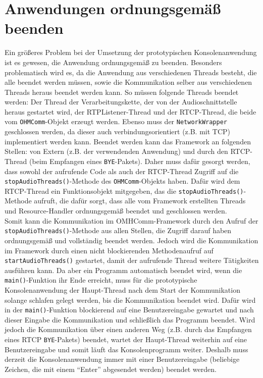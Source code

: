 \section{Anwendungen ordnungsgemäß beenden}
Ein größeres Problem bei der Umsetzung der prototypischen Konsolenanwendung ist es gewesen, die Anwendung ordnungsgemäß zu beenden. Besonders problematisch wird es, da die Anwendung aus verschiedenen Threads besteht, die alle beendet werden müssen, sowie die Kommunikation selber aus verschiedenen Threads heraus beendet werden kann. So müssen folgende Threads beendet werden: Der Thread der Verarbeitungskette, der von der Audioschnittstelle heraus gestartet wird, der RTPListener-Thread und der RTCP-Thread, die beide vom \texttt{OHMComm}-Objekt erzeugt werden. Ebenso muss der \texttt{NetworkWrapper} geschlossen werden, da dieser auch verbindungsorientiert (z.B. mit TCP) implementiert werden kann. Beendet werden kann das Framework an folgenden Stellen: von Extern (z.B. der verwendenden Anwendung) und durch den RTCP-Thread (beim Empfangen eines \texttt{BYE}-Pakets). Daher muss dafür gesorgt werden, dass sowohl der aufrufende Code als auch der RTCP-Thread Zugriff auf die \texttt{stopAudioThreads()}-Methode des \texttt{OHMComm}-Objekts haben. Dafür wird dem RTCP-Thread ein Funktionsobjekt mitgegeben, das die \texttt{stopAudioThreads()}-Methode aufruft, die dafür sorgt, dass alle vom Framework erstellten Threads und Resource-Handler ordnungsgemäß beendet und geschlossen werden.
\\
Somit kann die Kommunikation im OMHComm-Framework durch den Aufruf der \texttt{stopAudioThreads()}-Methode aus allen Stellen, die Zugriff darauf haben ordnungsgemäß und vollständig beendet werden. Jedoch wird die Kommunikation im Framework durch einen nicht blockierenden Methodenaufruf auf \texttt{startAudioThreads()} gestartet, damit der aufrufende Thread weitere Tätigkeiten ausführen kann. Da aber ein Programm automatisch beendet wird, wenn die \texttt{main()}-Funktion ihr Ende erreicht, muss für die prototypische Konsolenanwendung der Haupt-Thread nach dem Start der Kommunikation solange schlafen gelegt werden, bis die Kommunikation beendet wird. Dafür wird in der \texttt{main()}-Funktion blockierend auf eine Benutzereingabe gewartet und nach dieser Eingabe die Kommunikation und schließlich das Programm beendet. Wird jedoch die Kommunikation über einen anderen Weg (z.B. durch das Empfangen eines RTCP \texttt{BYE}-Pakets) beendet, wartet der Haupt-Thread weiterhin auf eine Benutzereingabe und somit läuft das Konsolenprogramm weiter. Deshalb muss derzeit die Konsolenanwendung immer mit einer Benutzereingabe (beliebige Zeichen, die mit einem \enquote{Enter} abgesendet werden) beendet werden.